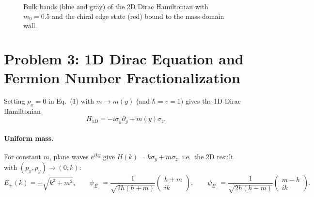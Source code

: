 \documentclass{article}
\begin{document}
	\begin{figure}[h]
		\centering
		\caption{Bulk bands (blue and gray) of the 2D Dirac Hamiltonian with $m_0 = 0.5$ and the chiral edge state (red) bound to the mass domain wall.}
	\end{figure}

    \section{Problem 3: 1D Dirac Equation and Fermion Number Fractionalization}
    Setting $p_x = 0$ in Eq.~(1) with $m \to m(y)$ (and $\hbar = v = 1$) gives the 1D Dirac Hamiltonian
    \begin{equation}
        H_{1D} = -i\sigma_y\partial_y + m(y)\sigma_z.
    \end{equation}

    \paragraph{Uniform mass.} For constant $m$, plane waves $e^{iky}$ give $H(k) = k\sigma_y + m\sigma_z$, i.e.\ the 2D result with $(p_x, p_y) \to (0,k)$:
    \begin{equation}
        E_\pm(k) = \pm\sqrt{k^2+m^2}, \qquad \psi_{E_+} = \frac{1}{\sqrt{2h(h + m)}}\begin{pmatrix} h + m \\ ik \end{pmatrix}, \qquad
        \psi_{E_-} = \frac{1}{\sqrt{2h(h - m)}}\begin{pmatrix} m - h \\ ik \end{pmatrix}.
    \end{equation}
\end{document}
